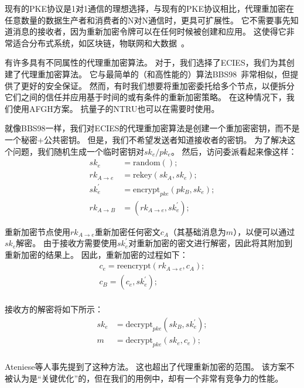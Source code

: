 \documentclass[longbibliography,nofootinbib]{revtex4-1}
\newcommand{\kms}{NuCypher KMS}
\begin{document}
\begin{CJK*}{UTF8}{gbsn}
现有的PKE协议是1对1通信的理想选择，与现有的PKE协议相比，代理重加密在任意数量的数据生产者和消费者的N对N通信时，更具可扩展性。
它不需要事先知道消息的接收者，因为重新加密令牌可以在任何时候被创建和应用。
这使得它非常适合分布式系统，如区块链，物联网和大数据~\cite{web:nucypher-hadoop}。

有许多具有不同属性的代理重加密算法。
对于，我们选择了ECIES，我们为其创建了代理重加密算法\cite{umbral-spec}。
它与最简单的（和高性能的）算法BBS98~\cite{BBS98}非常相似，但提供了更好的安全保证。
然而，有时我们想要将重加密委托给多个节点，以便拆分它们之间的信任并应用基于时间的或有条件的重新加密策略。
在这种情况下，我们使用AFGH方案\cite{AFGH}。
抗量子的NTRU也可以在需要时使用\cite{wiki:ntru,ntrureencrypt}。

就像BBS98一样，我们对ECIES的代理重加密算法是创建一个重加密密钥，而不是一个秘密+公共密钥。
但是，我们不希望发送者知道接收者的密钥。
为了解决这个问题，我们随机生成一个临时密钥对$sk_e/pk_e$。
然后，访问委派看起来像这样：
\begin{align}
    \label{eq:ephemeral-trick}
    sk_e &= \text{random}();\\
    rk_{A\rightarrow e} &= \text{rekey}(sk_A, sk_e);\\
    \label{eq:ephemeral-trick-end}
    sk_e^{\prime} &= \text{encrypt}_{pke}(pk_B, sk_e);\\
    rk_{A\rightarrow B} &= (rk_{A\rightarrow e}, sk_e^{\prime});
\end{align}

重新加密节点使用$rk_{A\rightarrow e}$重新加密任何密文$c_A$（其基础消息为$m$），以便可以通过$sk_e$解密。
由于接收方需要使用$sk_e^{\prime}$对重新加密的密文进行解密，因此将其附加到重新加密的结果上。
因此，重新加密的过程如下：
\begin{align}
    c_e = \text{reencrypt}(rk_{A\rightarrow e}, c_{A});\\
    c_B = (c_e, sk_e^{\prime});\\
\end{align}

接收方的解密将如下所示：
\begin{align}
    sk_e &= \text{decrypt}_{pke}(sk_B, sk_e^{\prime});\\
    m &= \text{decrypt}_{pke}(sk_e, c_e);\\
\end{align}

Ateniese等人\cite{AFGH}事先提到了这种方法。
这也超出了代理重新加密的范围。
该方案不被认为是“关键优化”的，但在我们的用例中，却有一个非常有竞争力的性能。


\end{CJK*}
\end{document}

